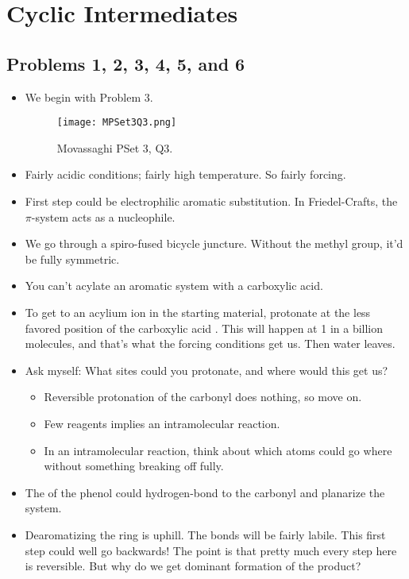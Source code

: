 \documentclass[../notes.tex]{subfiles}
\begin{document}
\chapter{Cyclic Intermediates}
\section{Problems 1, 2, 3, 4, 5, and 6}
\begin{itemize}
    \item {}We begin with Problem 3.
    \begin{figure}[h!]
        \centering
        \texttt{[image: MPSet3Q3.png]}
        \caption{Movassaghi PSet 3, Q3.}
        \label{fig:MPSet3Q3}
    \end{figure}
    \item Fairly acidic conditions; fairly high temperature. So fairly forcing.
    \item First step could be electrophilic aromatic substitution. In Friedel-Crafts, the $\pi$-system acts as a nucleophile.
    \item We go through a spiro-fused bicycle juncture. Without the methyl group, it'd be fully symmetric.
    \item You can't acylate an aromatic system with a carboxylic acid.
    \item To get to an acylium ion in the starting material, protonate at the less favored position of the carboxylic acid . This will happen at 1 in a billion molecules, and that's what the forcing conditions get us. Then water leaves.
    \item Ask myself: What sites could you protonate, and where would this get us?
    \begin{itemize}
        \item Reversible protonation of the carbonyl does nothing, so move on.
        \item Few reagents implies an intramolecular reaction.
        \item In an intramolecular reaction, think about which atoms could go where without something breaking off fully.
    \end{itemize}
    \item The  of the phenol could hydrogen-bond to the carbonyl and planarize the system.
    \item Dearomatizing the ring is uphill. The bonds will be fairly labile. This first step could well go backwards! The point is that pretty much every step here is reversible. But why do we get dominant formation of the product?

\end{itemize}
\end{document}
